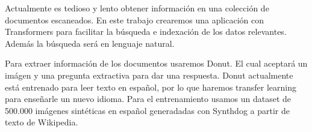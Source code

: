 \documentclass[../main.tex]{subfiles}
\begin{document}



Actualmente es tedioso y lento obtener información en una colección de documentos escaneados.
En este trabajo crearemos una aplicación con Transformers para facilitar la búsqueda e indexación de los datos relevantes.
Además la búsqueda será en lenguaje natural.

Para extraer información de los documentos usaremos Donut.
El cual aceptará un imágen y una pregunta extractiva para dar una respuesta.
Donut actualmente está entrenado para leer texto en español, por lo que haremos transfer learning para enseñarle un nuevo idioma.
Para el entrenamiento usamos un dataset de 500.000 imágenes sintéticas en español generadadas con Synthdog a partir de texto de Wikipedia.


%
\end{document}
